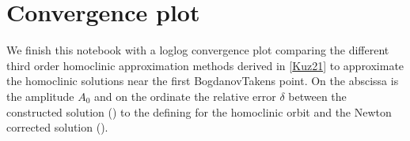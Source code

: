 \documentclass[letterpaper,10pt,english]{jupyterBook}
\begin{document}
\begin{sphinxVerbatim}[commandchars=\\\{\}]
\PYG{p}{[}\PYG{p}{]}
\end{sphinxVerbatim}

\noindent{}


\section{Convergence plot}
\label{\detokenize{extendedLorenz84model:convergence-plot}}
\sphinxAtStartPar
We finish this notebook with a log\sphinxhyphen{}log convergence plot comparing the different
third order homoclinic approximation methods derived in {[}\hyperlink{cite.references:id3}{Kuz21}{]}
to approximate the homoclinic solutions near the first Bogdanov\sphinxhyphen{}Takens point.
On the abscissa is the amplitude \(A_0\) and on the ordinate the relative error
\(\delta\) between the constructed solution () to the defining for the
homoclinic orbit and the Newton corrected solution ().
\end{document}

